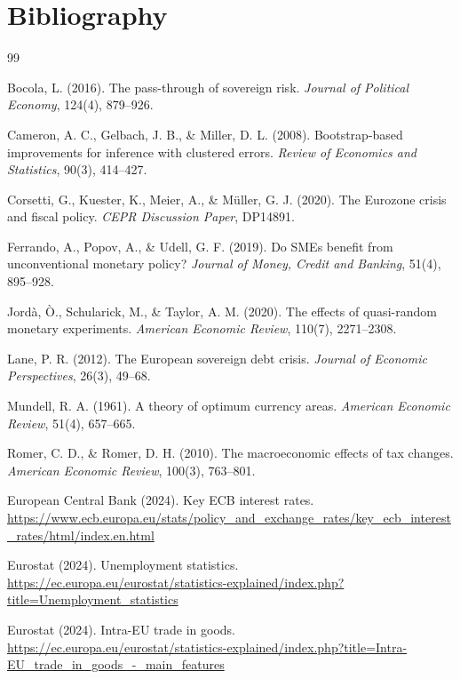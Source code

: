 \documentclass[12pt,a4paper]{article}
\begin{document}
\section*{Bibliography}

\begin{thebibliography}{99}

 Bocola, L. (2016). The pass-through of sovereign risk. \textit{Journal of Political Economy}, 124(4), 879--926.

 Cameron, A. C., Gelbach, J. B., \& Miller, D. L. (2008). Bootstrap-based improvements for inference with clustered errors. \textit{Review of Economics and Statistics}, 90(3), 414--427.

 Corsetti, G., Kuester, K., Meier, A., \& M\"{u}ller, G. J. (2020). The Eurozone crisis and fiscal policy. \textit{CEPR Discussion Paper}, DP14891.

 Ferrando, A., Popov, A., \& Udell, G. F. (2019). Do SMEs benefit from unconventional monetary policy? \textit{Journal of Money, Credit and Banking}, 51(4), 895--928.

 Jord\`{a}, \`{O}., Schularick, M., \& Taylor, A. M. (2020). The effects of quasi-random monetary experiments. \textit{American Economic Review}, 110(7), 2271--2308.

 Lane, P. R. (2012). The European sovereign debt crisis. \textit{Journal of Economic Perspectives}, 26(3), 49--68.

 Mundell, R. A. (1961). A theory of optimum currency areas. \textit{American Economic Review}, 51(4), 657--665.

 Romer, C. D., \& Romer, D. H. (2010). The macroeconomic effects of tax changes. \textit{American Economic Review}, 100(3), 763--801.

 European Central Bank (2024). Key ECB interest rates. \url{https://www.ecb.europa.eu/stats/policy_and_exchange_rates/key_ecb_interest_rates/html/index.en.html}

 Eurostat (2024). Unemployment statistics. \url{https://ec.europa.eu/eurostat/statistics-explained/index.php?title=Unemployment_statistics}

 Eurostat (2024). Intra-EU trade in goods. \url{https://ec.europa.eu/eurostat/statistics-explained/index.php?title=Intra-EU_trade_in_goods_-_main_features}

\end{thebibliography}
\end{document}
